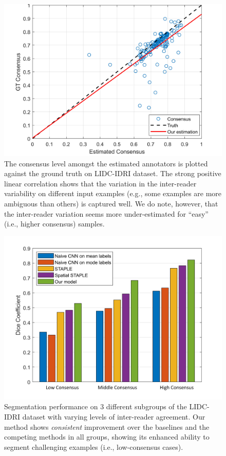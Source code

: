 \begin{figure}[t]
        \center
        \includegraphics[width=\linewidth]{chapter_8/picture92.jpg}
        \caption{The consensus level amongst the estimated annotators is plotted against the ground truth on LIDC-IDRI dataset. The strong positive linear correlation shows that the variation in the inter-reader variability on different input examples (e.g., some examples are more ambiguous than others) is captured well. We do note, however, that the inter-reader variation seems more under-estimated for ``easy'' (i.e., higher consensus) samples.}
        \label{consensus}
\end{figure}
    
\begin{figure}[t]
        \center
        \includegraphics[width=\linewidth]{chapter_8/picture93.jpg}
        \caption{Segmentation performance on 3 different subgroups of the LIDC-IDRI dataset with varying levels of inter-reader agreement. Our method shows \textit{consistent} improvement over the baselines and the competing methods in all groups, showing its enhanced ability to segment challenging examples (i.e., low-consensus cases).}
        \label{consensus dice}
\end{figure}

